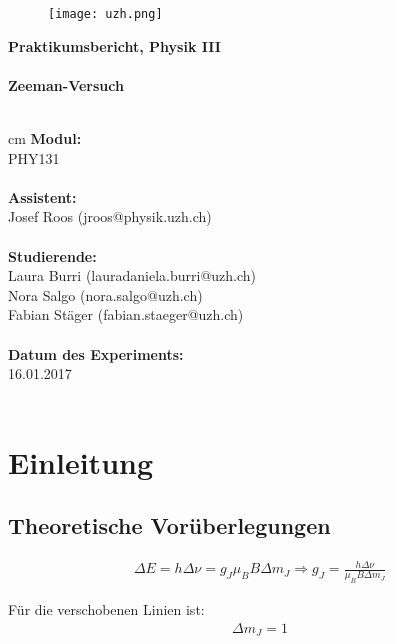 \documentclass[12pt,a4paper]{article} %
\begin{document}
\begin{titlepage} \begin{figure}[h] \hfill \texttt{[image: uzh.png]} \end{figure}
\vspace{2 cm}
\textbf{\large{Praktikumsbericht, Physik III}} \\ \vspace{1 cm} \\ \textbf{\huge{Zeeman-Versuch}} \\ \normalsize \\ \vspace{1 cm}
\par
\begingroup
{} cm
\rightskip\leftskip
\textbf{Modul:}\\ PHY131 \\ \\
\textbf{Assistent:}\\ Josef Roos (jroos@physik.uzh.ch)\\ \\
\textbf{Studierende:}\\
Laura Burri (lauradaniela.burri@uzh.ch)\\
Nora Salgo (nora.salgo@uzh.ch)\\
Fabian Stäger (fabian.staeger@uzh.ch) \\ \\
\textbf{Datum des Experiments:}\\ 16.01.2017 \\ \\
\par \endgroup \end{titlepage} \clearpage

\newpage
\tableofcontents
\newpage
\section{Einleitung}
\subsection{Theoretische Vorüberlegungen}


\begin{align}
\Delta E = h \Delta \nu = g_J \mu_B B \Delta m_J \Longrightarrow g_J=\frac{h\Delta \nu}{\mu_B B \Delta m_J}
\end{align}

Für die verschobenen Linien ist:
\begin{align}
\Delta m_J = 1
\end{align}
\end{document}
